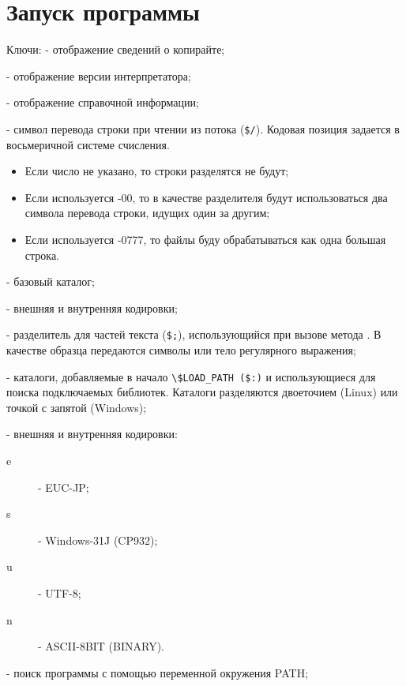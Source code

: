 \hypertarget{appbin}{}
\chapter{Запуск программы}

\begin{keylist}{Ключи:}
   - отображение сведений о копирайте; 
  
   - отображение версии интерпретатора;
  
   - отображение справочной информации;

   - символ перевода строки при чтении из потока (\verb!$/!). Кодовая позиция задается в восьмеричной системе счисления.
  \begin{itemize}
    \item Если число не указано, то строки разделятся не будут; 
    \item Если используется -00, то в качестве разделителя будут использоваться два символа перевода строки, идущих один за другим;
    \item Если используется -0777, то файлы буду обрабатываться как одна большая строка.
  \end{itemize}
   
   - базовый каталог;
  
   - внешняя и внутренняя кодировки;

   - разделитель для частей текста (\verb!$;!), использующийся при вызове метода . В качестве образца передаются символы или тело регулярного выражения;

   - каталоги, добавляемые в начало \verb!\$LOAD_PATH ($:)! и использующиеся для поиска подключаемых библиотек. Каталоги разделяются двоеточием (Linux) или точкой с запятой (Windows);

   - внешняя и внутренняя кодировки:
  \begin{description}
    \item[e] - EUC-JP;
    \item[s] - Windows-31J (CP932);
    \item[u] - UTF-8;
    \item[n] - ASCII-8BIT (BINARY).
  \end{description} 
  
   - поиск программы с помощью переменной окружения PATH;
  

\end{keylist}
